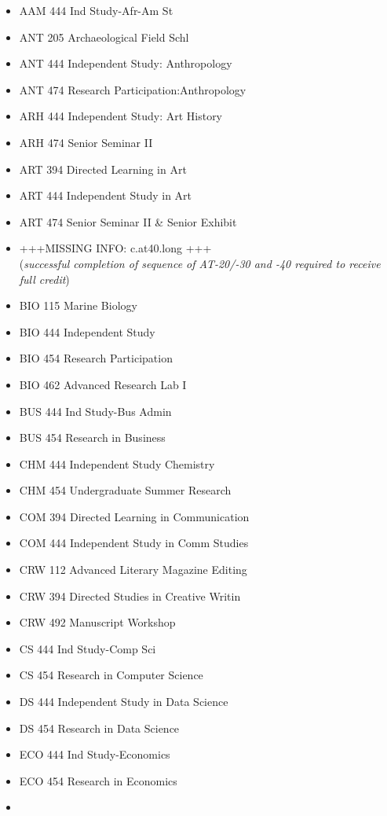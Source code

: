 \documentclass[
  letterpaper,
]{scrbook}
\providecommand{\tightlist}{%
  \setlength{\itemsep}{0pt}\setlength{\parskip}{0pt}}
\begin{document}
\begin{itemize}
\tightlist
\item
  AAM 444 Ind Study-Afr-Am St
\item
  ANT 205 Archaeological Field Schl
\item
  ANT 444 Independent Study: Anthropology
\item
  ANT 474 Research Participation:Anthropology
\item
  ARH 444 Independent Study: Art History
\item
  ARH 474 Senior Seminar II
\item
  ART 394 Directed Learning in Art
\item
  ART 444 Independent Study in Art
\item
  ART 474 Senior Seminar II \& Senior Exhibit
\item
  +++MISSING INFO: c.at40.long +++\\
  (\emph{successful completion of sequence of AT-20/-30 and -40 required
  to receive full credit})
\item
  BIO 115 Marine Biology
\item
  BIO 444 Independent Study
\item
  BIO 454 Research Participation
\item
  BIO 462 Advanced Research Lab I
\item
  BUS 444 Ind Study-Bus Admin
\item
  BUS 454 Research in Business
\item
  CHM 444 Independent Study Chemistry
\item
  CHM 454 Undergraduate Summer Research
\item
  COM 394 Directed Learning in Communication
\item
  COM 444 Independent Study in Comm Studies
\item
  CRW 112 Advanced Literary Magazine Editing
\item
  CRW 394 Directed Studies in Creative Writin
\item
  CRW 492 Manuscript Workshop
\item
  CS 444 Ind Study-Comp Sci
\item
  CS 454 Research in Computer Science
\item
  DS 444 Independent Study in Data Science
\item
  DS 454 Research in Data Science
\item
  ECO 444 Ind Study-Economics
\item
  ECO 454 Research in Economics
\item

\end{itemize}
\end{document}
